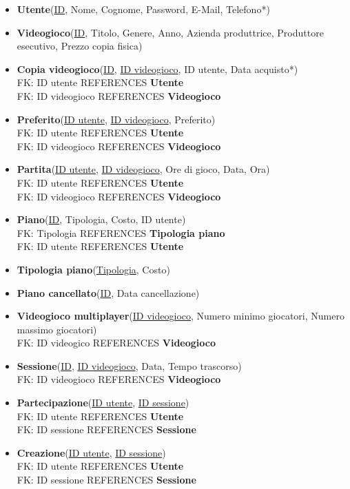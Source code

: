 \documentclass[a4paper,12pt]{report}
\begin{document}
\begin{itemize}

\item \textbf{Utente}(\underline{ID}, Nome, Cognome, Password, E-Mail, Telefono*)
\item \textbf{Videogioco}(\underline{ID}, Titolo, Genere, Anno, Azienda produttrice, Produttore esecutivo, Prezzo copia fisica)
\item \textbf{Copia videogioco}(\underline{ID}, \underline{ID videogioco}, ID utente, Data acquisto*) \\
FK: ID utente REFERENCES \textbf{Utente} \\
FK: ID videogioco REFERENCES \textbf{Videogioco}
\item \textbf{Preferito}(\underline{ID utente}, \underline{ID videogioco}, Preferito) \\
FK: ID utente REFERENCES \textbf{Utente} \\
FK: ID videogioco REFERENCES \textbf{Videogioco}
\item \textbf{Partita}(\underline{ID utente}, \underline{ID videogioco}, Ore di gioco, Data, Ora) \\
FK: ID utente REFERENCES \textbf{Utente} \\
FK: ID videogioco REFERENCES \textbf{Videogioco}
\item \textbf{Piano}(\underline{ID}, Tipologia, Costo, ID utente) \\
FK: Tipologia REFERENCES \textbf{Tipologia piano} \\
FK: ID utente REFERENCES \textbf{Utente}
\item \textbf{Tipologia piano}(\underline{Tipologia}, Costo)
\item \textbf{Piano cancellato}(\underline{ID}, Data cancellazione)
\item \textbf{Videogioco multiplayer}(\underline{ID videogioco}, Numero minimo giocatori, Numero massimo giocatori) \\
FK: ID videogico REFERENCES \textbf{Videogioco}
\item \textbf{Sessione}(\underline{ID}, \underline{ID videogioco}, Data, Tempo trascorso) \\
FK: ID videogioco REFERENCES \textbf{Videogioco}
\item \textbf{Partecipazione}(\underline{ID utente}, \underline{ID sessione}) \\
FK: ID utente REFERENCES \textbf{Utente} \\
FK: ID sessione REFERENCES \textbf{Sessione}
\item \textbf{Creazione}(\underline{ID utente}, \underline{ID sessione}) \\
FK: ID utente REFERENCES \textbf{Utente} \\
FK: ID sessione REFERENCES \textbf{Sessione} \\

\end{itemize}
\end{document}
